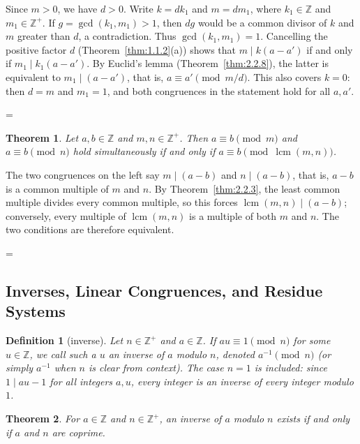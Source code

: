 \documentclass[11pt]{article}
\makeatletter
\theoremstyle{ntstyle}
\newtheorem{theorem}{Theorem}[subsection]
\newtheorem{definition}{Definition}[subsection]
\let\nt@closedisplay\]
\def\nt@guardedclose{\@ifnextchar\par{\nt@closeafterpar}{\@ifnextchar\end{\postdisplaypenalty\@M\nt@closedisplay}{\nt@closedisplay}}}
\def\nt@closeafterpar\par{\@ifnextchar\par{\nt@closeafterpar}{\@ifnextchar\end{\postdisplaypenalty\@M\nt@closedisplay\par}{\nt@closedisplay\par}}}
\renewenvironment{proof}[1][\proofname]{\par
  \pushQED{\qed}\normalfont\topsep\medskipamount\edef\nt@afterproof{\@endparpenalty=\the\@endparpenalty\relax}\@beginparpenalty\@M\@endparpenalty\@M\let\]\nt@guardedclose\trivlist\item[]\textit{#1\@addpunct{.}} \ignorespaces}{\ifvmode\addpenalty\@M\fi\popQED\nt@afterproof\endtrivlist\@endpefalse}
\DeclareMathOperator{\lcm}{lcm}
\makeatother
\begin{document}
\begin{proof} Since $m>0$, we have $d>0$. Write $k=dk_1$ and
	$m=dm_1$, where $k_1\in\mathbb{Z}$ and $m_1\in\mathbb{Z}^+$.
	If $g=\gcd(k_1,m_1)>1$, then $dg$ would be a common divisor of $k$
	and $m$ greater than $d$, a contradiction. Thus $\gcd(k_1,m_1)=1$.
	Cancelling the positive factor $d$ (Theorem~\ref{thm:1.1.2}(a)) shows that
	$m\mid k(a-a')$ if and only if $m_1\mid k_1(a-a')$.
	By Euclid's lemma (Theorem~\ref{thm:2.2.8}), the latter is equivalent to
	$m_1\mid(a-a')$, that is, $a\equiv a'\pmod{m/d}$.
	This also covers $k=0$: then $d=m$ and $m_1=1$, and both congruences
	in the statement hold for all $a,a'$.

\end{proof}
\begin{theorem}\label{thm:3.1.3} Let $a, b \in
		\mathbb{Z}$ and $m, n \in \mathbb{Z}^+$. Then $a \equiv b \pmod{m}$
	and $a \equiv b \pmod{n}$ hold simultaneously if and only if $a \equiv b
		\pmod{\lcm(m, n)}$.

\end{theorem}

\begin{proof} The two congruences on the left say $m \mid (a
		- b)$ and $n \mid (a - b)$, that is, $a - b$ is a common multiple of $m$
	and $n$. By Theorem~\ref{thm:2.2.3}, the least common multiple divides every common
	multiple, so this forces $\lcm(m, n) \mid (a - b)$;
	conversely, every multiple of $\lcm(m, n)$ is a multiple of
	both $m$ and $n$. The two conditions are therefore equivalent.

\end{proof}
\subsection{Inverses, Linear Congruences, and Residue Systems}

\begin{definition}[inverse]\label{def:3.2.1} Let $n \in
		\mathbb{Z}^+$ and $a \in \mathbb{Z}$. If
	$au \equiv 1 \pmod{n}$ for some $u \in \mathbb{Z}$, we call such a $u$ an inverse of $a$ modulo $n$, denoted $a^{-1} \pmod{n}$ (or simply $a^{-1}$ when
	$n$ is clear from context).
	The case $n=1$ is included: since $1\mid au-1$ for all integers $a,u$,
	every integer is an inverse of every integer modulo $1$.

\end{definition}
\begin{theorem}\label{thm:3.2.1} For $a \in \mathbb{Z}$ and $n\in\mathbb{Z}^+$, an inverse of
	$a$ modulo $n$ exists if and only if $a$ and $n$ are coprime.

\end{theorem}
\end{document}
